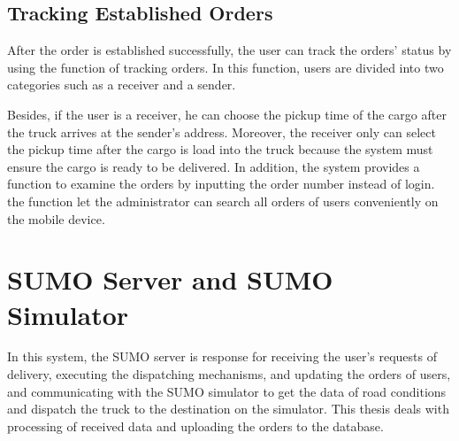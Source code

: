 \documentclass[12pt]{ksthesis}
\begin{document}
\begin{thesis}
{\subsection{Tracking Established Orders}
After the order is established successfully, the user can track the orders’ status by using the function of tracking orders. In this function, users are divided into two categories such as a receiver and a sender.

Besides, if the user is a receiver, he can choose the pickup time of the cargo after the truck arrives at the sender’s address.  
Moreover, the receiver only can select the pickup time after the cargo is load into the truck because the system must ensure the cargo is ready to be delivered. 
In addition, the system provides a function to examine the orders by inputting the order number instead of login. the function let the administrator can search all orders of users conveniently on the mobile device.

\section{SUMO Server and SUMO Simulator}
In this system, the SUMO server is response for receiving the user’s requests of delivery, executing the dispatching mechanisms, and updating the orders of users, and communicating with the SUMO simulator to get the data of road conditions and dispatch the truck to the destination on the simulator. This thesis deals with processing of received data and uploading the orders to the database.

}
\end{thesis}
\end{document}
